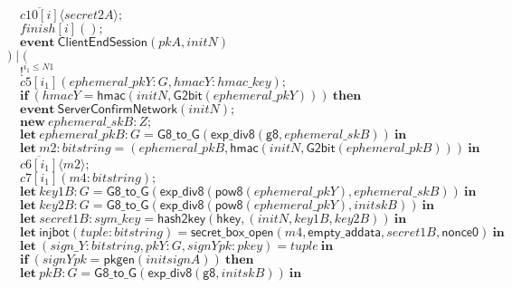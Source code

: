\documentclass{article}
\newcommand{\cinput}[2]{{#1}({#2})}
\newcommand{\coutput}[2]{\overline{#1}\langle{#2}\rangle}
\newcommand{\kw}[1]{\mathbf{#1}}
\newcommand{\kwf}[1]{\mathsf{#1}}
\newcommand{\var}[1]{\mathit{#1}}
\newcommand{\kwt}[1]{\mathit{#1}}
\newcommand{\kwp}[1]{\mathit{#1}}
\newcommand{\kwc}[1]{\mathit{#1}}
\begin{document}
\begin{tabbing}
\>$\quad \coutput{\kwc{c10}[\var{i}]}{\var{secret2A}};$\\
\>$\quad \cinput{\kwc{finish}[\var{i}]}{};$\\
\>$\quad \kw{event}\ \kwf{ClientEndSession}(\var{pkA}, \var{initN})$\\
\>$) \mid ($\\
\>$\quad !^{\var{i}_{1} \leq \kwp{N1}}$\\
\>$\quad \cinput{\kwc{c5}[\var{i}_{1}]}{\var{ephemeral{\_}pkY}: \kwt{G}, \var{hmacY}: \kwt{hmac{\_}key}};$\\
\>$\quad \kw{if}\ (\var{hmacY}  =  \kwf{hmac}(\var{initN}, \kwf{G2bit}(\var{ephemeral{\_}pkY})))\ \kw{then}$\\
\>$\quad \kw{event}\ \kwf{ServerConfirmNetwork}(\var{initN});$\\
\>$\quad \kw{new}\ \var{ephemeral{\_}skB}: \kwt{Z};$\\
\>$\quad \kw{let}\ \var{ephemeral{\_}pkB}: \kwt{G} = \kwf{G8{\_}to{\_}G}(\kwf{exp{\_}div8}(\kwf{g8}, \var{ephemeral{\_}skB}))\ \kw{in}$\\
\>$\quad \kw{let}\ \var{m2}: \kwt{bitstring} = \kwf{}(\var{ephemeral{\_}pkB}, \kwf{hmac}(\var{initN}, \kwf{G2bit}(\var{ephemeral{\_}pkB})))\ \kw{in}$\\
\>$\quad \coutput{\kwc{c6}[\var{i}_{1}]}{\var{m2}};$\\
\>$\quad \cinput{\kwc{c7}[\var{i}_{1}]}{\var{m4}: \kwt{bitstring}};$\\
\>$\quad \kw{let}\ \var{key1B}: \kwt{G} = \kwf{G8{\_}to{\_}G}(\kwf{exp{\_}div8}(\kwf{pow8}(\var{ephemeral{\_}pkY}), \var{ephemeral{\_}skB}))\ \kw{in}$\\
\>$\quad \kw{let}\ \var{key2B}: \kwt{G} = \kwf{G8{\_}to{\_}G}(\kwf{exp{\_}div8}(\kwf{pow8}(\var{ephemeral{\_}pkY}), \var{initskB}))\ \kw{in}$\\
\>$\quad \kw{let}\ \var{secret1B}: \kwt{sym{\_}key} = \kwf{hash2key}(\kwf{hkey}, \kwf{}(\var{initN}, \var{key1B}, \var{key2B}))\ \kw{in}$\\
\>$\quad \kw{let}\ \kwf{injbot}(\var{tuple}: \kwt{bitstring}) = \kwf{secret{\_}box{\_}open}(\var{m4}, \kwf{empty{\_}addata}, \var{secret1B}, \kwf{nonce0})\ \kw{in}$\\
\>$\quad \kw{let}\ \kwf{}(\var{sign{\_}Y}: \kwt{bitstring}, \var{pkY}: \kwt{G}, \var{signYpk}: \kwt{pkey}) = \var{tuple}\ \kw{in}$\\
\>$\quad \kw{if}\ (\var{signYpk}  =  \kwf{pkgen}(\var{initsignA}))\ \kw{then}$\\
\>$\quad \kw{let}\ \var{pkB}: \kwt{G} = \kwf{G8{\_}to{\_}G}(\kwf{exp{\_}div8}(\kwf{g8}, \var{initskB}))\ \kw{in}$\\

\end{tabbing}
\end{document}
